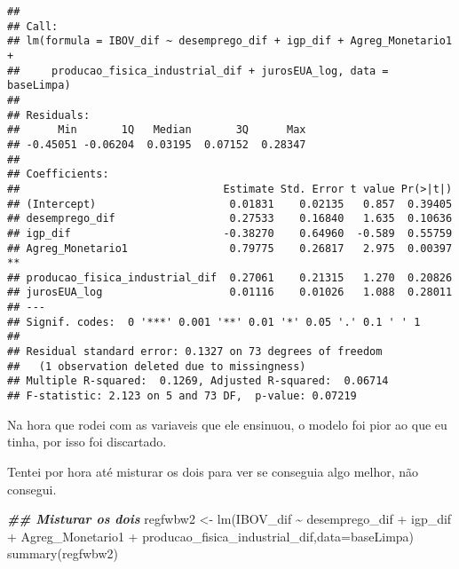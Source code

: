 \documentclass[
]{article}
\newenvironment{Shaded}{\begin{snugshade}}{\end{snugshade}}
\newcommand{\AttributeTok}[1]{\textcolor[rgb]{0.77,0.63,0.00}{#1}}
\newcommand{\DocumentationTok}[1]{\textcolor[rgb]{0.56,0.35,0.01}{\textbf{\textit{#1}}}}
\newcommand{\FunctionTok}[1]{\textcolor[rgb]{0.00,0.00,0.00}{#1}}
\newcommand{\NormalTok}[1]{#1}
\newcommand{\OtherTok}[1]{\textcolor[rgb]{0.56,0.35,0.01}{#1}}
\newcommand{\SpecialCharTok}[1]{\textcolor[rgb]{0.00,0.00,0.00}{#1}}
\begin{document}
\begin{verbatim}
## 
## Call:
## lm(formula = IBOV_dif ~ desemprego_dif + igp_dif + Agreg_Monetario1 + 
##     producao_fisica_industrial_dif + jurosEUA_log, data = baseLimpa)
## 
## Residuals:
##      Min       1Q   Median       3Q      Max 
## -0.45051 -0.06204  0.03195  0.07152  0.28347 
## 
## Coefficients:
##                                Estimate Std. Error t value Pr(>|t|)   
## (Intercept)                     0.01831    0.02135   0.857  0.39405   
## desemprego_dif                  0.27533    0.16840   1.635  0.10636   
## igp_dif                        -0.38270    0.64960  -0.589  0.55759   
## Agreg_Monetario1                0.79775    0.26817   2.975  0.00397 **
## producao_fisica_industrial_dif  0.27061    0.21315   1.270  0.20826   
## jurosEUA_log                    0.01116    0.01026   1.088  0.28011   
## ---
## Signif. codes:  0 '***' 0.001 '**' 0.01 '*' 0.05 '.' 0.1 ' ' 1
## 
## Residual standard error: 0.1327 on 73 degrees of freedom
##   (1 observation deleted due to missingness)
## Multiple R-squared:  0.1269, Adjusted R-squared:  0.06714 
## F-statistic: 2.123 on 5 and 73 DF,  p-value: 0.07219
\end{verbatim}

Na hora que rodei com as variaveis que ele ensinuou, o modelo foi pior
ao que eu tinha, por isso foi discartado.

Tentei por hora até misturar os dois para ver se conseguia algo melhor,
não consegui.

\begin{Shaded}
\begin{Highlighting}[]
\DocumentationTok{\#\# Misturar os dois}
\NormalTok{regfwbw2 }\OtherTok{\textless{}{-}} \FunctionTok{lm}\NormalTok{(IBOV\_dif }\SpecialCharTok{\textasciitilde{}}\NormalTok{ desemprego\_dif }\SpecialCharTok{+}\NormalTok{ igp\_dif }\SpecialCharTok{+}\NormalTok{ Agreg\_Monetario1 }\SpecialCharTok{+}\NormalTok{ producao\_fisica\_industrial\_dif,}\AttributeTok{data=}\NormalTok{baseLimpa)}
\FunctionTok{summary}\NormalTok{(regfwbw2)}
\end{Highlighting}
\end{Shaded}
\end{document}
